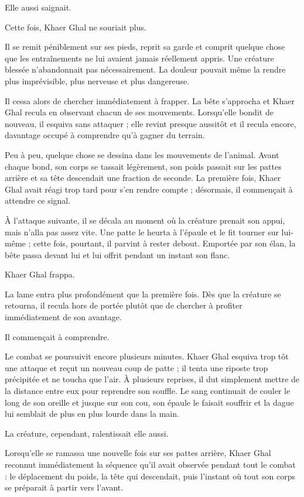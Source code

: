 Elle aussi saignait.

Cette fois, Khaer Ghal ne souriait plus.

Il se remit péniblement sur ses pieds, reprit sa garde et comprit quelque
chose que les entraînements ne lui avaient jamais réellement appris. Une
créature blessée n'abandonnait pas nécessairement. La douleur pouvait même la
rendre plus imprévisible, plus nerveuse et plus dangereuse.

Il cessa alors de chercher immédiatement à frapper. La bête s'approcha et
Khaer Ghal recula en observant chacun de ses mouvements. Lorsqu'elle bondit de
nouveau, il esquiva sans attaquer ; elle revint presque aussitôt et il recula
encore, davantage occupé à comprendre qu'à gagner du terrain.

Peu à peu, quelque chose se dessina dans les mouvements de l'animal. Avant
chaque bond, son corps se tassait légèrement, son poids passait sur les pattes
arrière et sa tête descendait une fraction de seconde. La première fois,
Khaer Ghal avait réagi trop tard pour s'en rendre compte ; désormais, il
commençait à attendre ce signal.

À l'attaque suivante, il se décala au moment où la créature prenait son appui,
mais n'alla pas assez vite. Une patte le heurta à l'épaule et le fit tourner
sur lui-même ; cette fois, pourtant, il parvint à rester debout. Emportée par
son élan, la bête passa devant lui et lui offrit pendant un instant son flanc.

Khaer Ghal frappa.

La lame entra plus profondément que la première fois. Dès que la créature se
retourna, il recula hors de portée plutôt que de chercher à profiter
immédiatement de son avantage.

Il commençait à comprendre.

Le combat se poursuivit encore plusieurs minutes. Khaer Ghal esquiva trop tôt
une attaque et reçut un nouveau coup de patte ; il tenta une riposte trop
précipitée et ne toucha que l'air. À plusieurs reprises, il dut simplement
mettre de la distance entre eux pour reprendre son souffle. Le sang continuait
de couler le long de son oreille et jusque sur son cou, son épaule le faisait
souffrir et la dague lui semblait de plus en plus lourde dans la main.

La créature, cependant, ralentissait elle aussi.

Lorsqu'elle se ramassa une nouvelle fois sur ses pattes arrière, Khaer Ghal
reconnut immédiatement la séquence qu'il avait observée pendant tout le
combat : le déplacement du poids, la tête qui descendait, puis l'instant où
tout son corps se préparait à partir vers l'avant.

